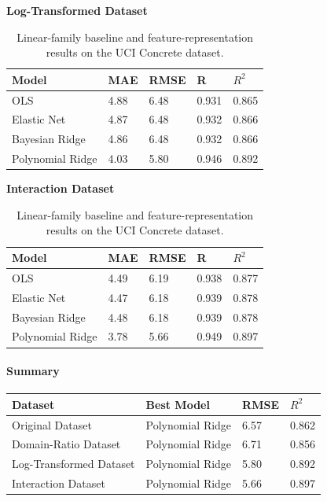 \documentclass{article}
\begin{document}
\begin{table}[H]
\begin{minipage}[t]{0.48\textwidth}
\centering
\textbf{Log-Transformed Dataset}\\[0.4em]
\begin{tabular}{@{}lllll@{}}
\toprule
\textbf{Model} & \textbf{MAE} & \textbf{RMSE} & \textbf{R} & \textbf{$R^2$} \\
\midrule
OLS              & 4.88 & 6.48 & 0.931 & 0.865 \\
Elastic Net      & 4.87 & 6.48 & 0.932 & 0.866 \\
Bayesian Ridge   & 4.86 & 6.48 & 0.932 & 0.866 \\
Polynomial Ridge & 4.03 & 5.80 & 0.946 & 0.892 \\
\bottomrule
\end{tabular}
\end{minipage}
\hfill
\begin{minipage}[t]{0.48\textwidth}
\centering
\textbf{Interaction Dataset}\\[0.4em]
\begin{tabular}{@{}lllll@{}}
\toprule
\textbf{Model} & \textbf{MAE} & \textbf{RMSE} & \textbf{R} & \textbf{$R^2$} \\
\midrule
OLS              & 4.49 & 6.19 & 0.938 & 0.877 \\
Elastic Net      & 4.47 & 6.18 & 0.939 & 0.878 \\
Bayesian Ridge   & 4.48 & 6.18 & 0.939 & 0.878 \\
Polynomial Ridge & 3.78 & 5.66 & 0.949 & 0.897 \\
\bottomrule
\end{tabular}
\end{minipage}

\caption{Linear-family baseline and feature-representation results on the UCI Concrete dataset.}
\end{table}

\paragraph{Summary}
\begin{center}
\begin{tabular}{@{}llll@{}}
\toprule
\textbf{Dataset} & \textbf{Best Model} & \textbf{RMSE} & \textbf{$R^2$} \\
\midrule
Original Dataset        & Polynomial Ridge & 6.57 & 0.862 \\
Domain-Ratio Dataset    & Polynomial Ridge & 6.71 & 0.856 \\
Log-Transformed Dataset & Polynomial Ridge & 5.80 & 0.892 \\
Interaction Dataset     & Polynomial Ridge & 5.66 & 0.897 \\
\bottomrule
\end{tabular}
\end{center}
\end{document}
